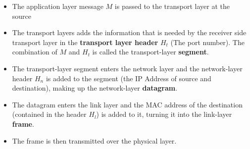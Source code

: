 \documentclass{article}
\theoremstyle{plain}
\theoremstyle{definition}
\begin{document}
\begin{itemize}
    \item The application layer message $M$ is passed to the transport layer at the source
    
    \item The transport layers adds the information that is needed by the receiver side transport layer in the \textbf{transport layer header} $H_t$ (The port number). The combination of $M$ and $H_t$ is called the transport-layer \textbf{segment}.
    
    \item The transport-layer segment enters the network layer and the network-layer header $H_n$ is added to the segment (the IP Address of source and destination), making up the network-layer \textbf{datagram}.
    
    \item The datagram enters the link layer and the MAC address of the destination (contained in the header $H_l$) is added to it, turning it into the link-layer \textbf{frame}. 
    
    \item The frame is then transmitted over the physical layer.
\end{itemize}
\end{document}
